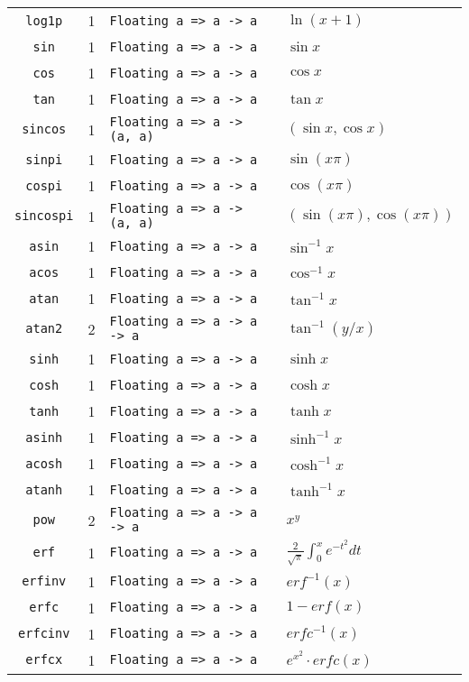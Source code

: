 \begin{longtable}[c]{ccll}
  \texttt{log1p} & 1 & \texttt{Floating a => a -> a} & $\ln (x+1)$\\
  \texttt{sin} & 1 & \texttt{Floating a => a -> a} & $\sin x$\\
  \texttt{cos} & 1 & \texttt{Floating a => a -> a} & $\cos x$\\
  \texttt{tan} & 1 & \texttt{Floating a => a -> a} & $\tan x$\\
  \texttt{sincos} & 1 & \texttt{Floating a => a -> (a, a)} & $(\sin x, \cos x)$\\
  \texttt{sinpi} & 1 & \texttt{Floating a => a -> a} & $\sin (x\pi)$\\
  \texttt{cospi} & 1 & \texttt{Floating a => a -> a} & $\cos (x\pi)$\\
  \texttt{sincospi} & 1 & \texttt{Floating a => a -> (a, a)} & $(\sin (x\pi), \cos (x\pi))$\\
  \texttt{asin} & 1 & \texttt{Floating a => a -> a} & $\sin^{-1} x$\\
  \texttt{acos} & 1 & \texttt{Floating a => a -> a} & $\cos^{-1} x$\\
  \texttt{atan} & 1 & \texttt{Floating a => a -> a} & $\tan^{-1} x$\\
  \texttt{atan2} & 2 & \texttt{Floating a => a -> a -> a} & $\tan^{-1} (y/x)$\\
  \texttt{sinh} & 1 & \texttt{Floating a => a -> a} & $\sinh x$\\
  \texttt{cosh} & 1 & \texttt{Floating a => a -> a} & $\cosh x$\\
  \texttt{tanh} & 1 & \texttt{Floating a => a -> a} & $\tanh x$\\
  \texttt{asinh} & 1 & \texttt{Floating a => a -> a} & $\sinh^{-1} x$\\
  \texttt{acosh} & 1 & \texttt{Floating a => a -> a} & $\cosh^{-1} x$\\
  \texttt{atanh} & 1 & \texttt{Floating a => a -> a} & $\tanh^{-1} x$\\
  \texttt{pow} & 2 & \texttt{Floating a => a -> a -> a} & $x^y$\\
  \texttt{erf} & 1 & \texttt{Floating a => a -> a} & $\frac{2}{\sqrt{\pi}}\int_0^x e^{-t^2}dt$\\
  \texttt{erfinv} & 1 & \texttt{Floating a => a -> a} & $erf^{-1}(x)$\\
  \texttt{erfc} & 1 & \texttt{Floating a => a -> a} & $1-erf(x)$\\
  \texttt{erfcinv} & 1 & \texttt{Floating a => a -> a} & $erfc^{-1}(x)$\\
  \texttt{erfcx} & 1 & \texttt{Floating a => a -> a} & $e^{x^2}\cdot{}erfc(x)$\\


\end{longtable}
